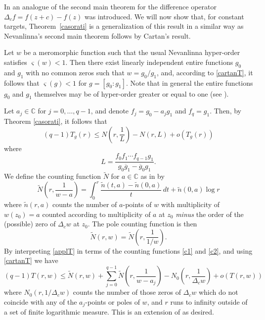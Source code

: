 \documentclass{amsart}
\newcommand{\C}{\mathbb{C}}
\theoremstyle{definition}
\numberwithin{equation}{section}
\numberwithin{theorem}{section}
\begin{document}
In \cite{halburdk:06AASFM} an analogue of the second main theorem
for the difference operator $\Delta_c f=f(z+c)-f(z)$ was introduced.
We will now show that, for constant targets, Theorem~\ref{casorati} is a generalization
of this result in a similar way as Nevanlinna's second main
theorem follows by Cartan's result.

Let $w$ be a meromorphic function such that the usual Nevanlinna
hyper-order satisfies $\varsigma(w)<1$. Then there exist linearly independent
entire functions $g_0$ and $g_1$ with no common zeros such that
$w=g_0/g_1$, and, according to \eqref{cartanT}, it follows that
$\varsigma(g)<1$ for $g=[g_0:g_1]$. Note that in general the
entire functions $g_0$ and $g_1$ themselves may be of hyper-order greater or
equal to one (see
\cite{bergweiler:94}).

Let $a_j\in\C$ for $j=0,\ldots,q-1$, and denote $f_j=g_0-a_j g_1$
and $f_{q}=g_1$. Then, by Theorem \ref{casorati}, it follows that
    \begin{equation}\label{applT}
    (q-1)T_g(r)\leq N\left(r,\frac{1}{L}\right)-N(r,L)+o(T_g(r))
    \end{equation}
where
    \begin{equation*}
    L=\frac{f_0f_1\cdots
    f_{q-1}g_{1}}{g_0\overline{g}_1-\overline{g}_0
    g_1}.
    \end{equation*}
We define the counting function $\widetilde{N}$ for $a\in\C$ as in
\cite{halburdk:06AASFM} by
    \begin{equation}\label{c1}
    \widetilde{N}\left(r,\frac{1}{w-a}\right)=\int_0^r\frac{\widetilde{n}(t,a)-\widetilde{n}(0,a)}{t}\,dt+
    \widetilde{n}(0,a)\log r
    \end{equation}
where $\widetilde{n}(r,a)$ counts the number of $a$-points of $w$
with multiplicity of $w(z_0)=a$ counted according to multiplicity
of $a$ at $z_0$ \textit{minus} the order of the (possible) zero of
$\Delta_c w$ at $z_0$. The pole counting function is then
    \begin{equation}\label{c2}
    \widetilde{N}(r,w)=\widetilde{N}\left(r,\frac{1}{1/w}\right).
    \end{equation}
By interpreting \eqref{applT} in terms of the counting
functions \eqref{c1} and \eqref{c2}, and using \eqref{cartanT} we
have
    \begin{equation*}
    (q-1)T(r,w)\leq \widetilde{N}(r,w)+ \sum_{j=0}^{q-1}
    \widetilde{N}\left(r,\frac{1}{w-a_j}\right)-N_0\left(r,\frac{1}{\Delta_c w}\right)
    +o(T(r,w))
    \end{equation*}
where $N_0(r,1/\Delta_c w)$ counts the number of those zeros of
$\Delta_c w$ which do not coincide with any of the $a_j$-points or
poles of $w$, and $r$ runs to infinity outside of a set of finite
logarithmic measure. This is an extension of \cite[Theorem
2.5]{halburdk:06AASFM} as desired.
\end{document}

